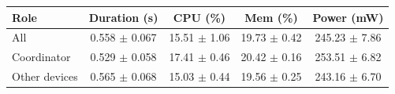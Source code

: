 \begin{tabular}{lcccc}
\hline
\textbf{Role} & \textbf{Duration (s)} & \textbf{CPU (\%)} & \textbf{Mem (\%)} & \textbf{Power (mW)} \\
\hline
All & 0.558 $\pm$ 0.067 & 15.51 $\pm$ 1.06 & 19.73 $\pm$ 0.42 & 245.23 $\pm$ 7.86 \\
Coordinator & 0.529 $\pm$ 0.058 & 17.41 $\pm$ 0.46 & 20.42 $\pm$ 0.16 & 253.51 $\pm$ 6.82 \\
Other devices & 0.565 $\pm$ 0.068 & 15.03 $\pm$ 0.44 & 19.56 $\pm$ 0.25 & 243.16 $\pm$ 6.70 \\
\hline
\end{tabular}
